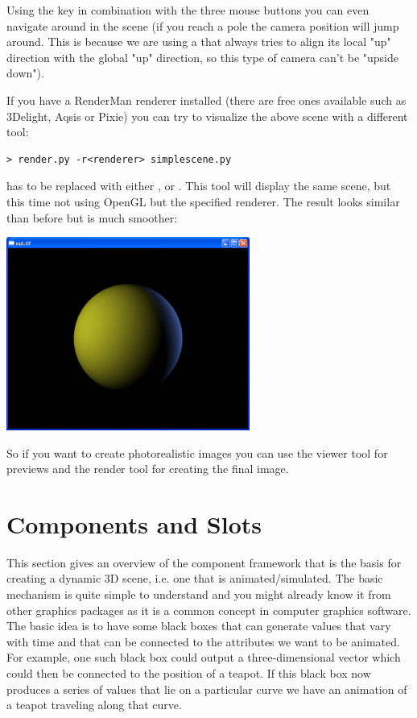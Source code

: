Using the  key in combination with the three mouse buttons
you can even navigate around in the scene (if you reach a pole
the camera position will jump around. This is because we are using
a  that always tries to align its local "up"
direction with the global "up" direction, so this type of camera
can't be "upside down").

If you have a RenderMan renderer installed (there are free ones available
such as 3Delight, Aqsis or Pixie) you can try to visualize the above scene
with a different tool:

\begin{verbatim}
> render.py -r<renderer> simplescene.py
\end{verbatim}

 has to be replaced with either , 
 or . 
This tool will display the same scene, but this time not using OpenGL but
the specified renderer. The result looks similar than before but is
much smoother:

\begin{center}
\includegraphics[width=8cm]{pics/simplescene2}
\end{center}

So if you want to create photorealistic images you can use the viewer tool
for previews and the render tool for creating the final image.

\section{Components and Slots}

This section gives an overview of the component framework that is the
basis for creating a dynamic 3D scene, i.e. one that is
animated/simulated. The basic mechanism is quite simple to understand
and you might already know it from other graphics packages as it is a
common concept in computer graphics software. The basic idea is to
have some black boxes that can generate values that vary with time and
that can be connected to the attributes we want to be animated. For
example, one such black box could output a three-dimensional vector
which could then be connected to the position of a teapot. If this
black box now produces a series of values that lie on a particular
curve we have an animation of a teapot traveling along that curve.

